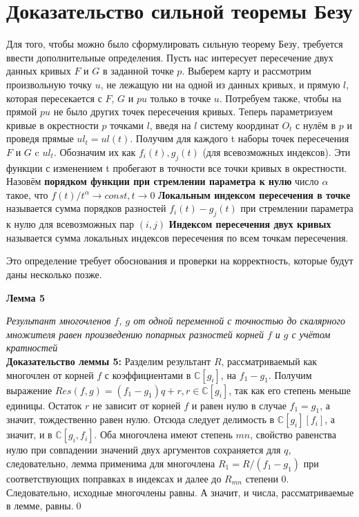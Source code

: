 \documentclass[a4paper, 12pt]{article}
\begin{document}
\pagebreak
\section{Доказательство сильной теоремы Безу}
Для того, чтобы можно было сформулировать сильную теорему Безу, требуется ввести дополнительные определения.\newline
Пусть нас интересует пересечение двух данных кривых $F$ и $G$ в заданной точке $p$. Выберем карту и рассмотрим произвольную точку $u$, не лежащую ни на одной из данных кривых, и прямую $l$, которая пересекается с $F$, $G$ и $pu$ только в точке $u$. Потребуем также, чтобы на прямой $pu$ не было других точек пересечения кривых. Теперь параметризуем кривые в окрестности $p$ точками $l$, введя на $l$ систему координат $O_t$ с нулём в $p$ и проведя прямые $ul_t=ul(t)$. Получим для каждого t наборы точек пересечения $F$ и $G$ c $ul_t$. Обозначим их как $f_i(t), g_j(t)$ (для всевозможных индексов). Эти функции с изменением t пробегают в точности все точки кривых в окрестности. \newline %
Назовём \textbf{порядком функции при стремлении параметра к нулю} число $\alpha$ такое, что $f(t)/t^\alpha \rightarrow const, t \rightarrow 0$\newline
\textbf{Локальным индексом пересечения в точке} называется сумма порядков разностей $f_i(t) - g_j(t)$ при стремлении параметра к нулю для всевозможных пар $(i,j)$\newline
\textbf{Индексом пересечения двух кривых} называется сумма локальных индексов пересечения по всем точкам пересечения.
\newline

Это определение требует обоснования и проверки на корректность, которые будут даны несколько позже.
\newline

\textbf{Лемма 5}

\textit{Результант многочленов $f$, $g$ от одной переменной с точностью до скалярного множителя равен произведению попарных разностей корней $f$ и $g$ с учётом кратностей}\\

\textbf{Доказательство леммы 5:}\newline
Разделим результант $R$, рассматриваемый как многочлен от корней $f$ с коэффициентами в $\mathbb{C}[g_i]$, на $f_1 - g_1$. Получим выражение $Res(f,g) = (f_1 - g_1)q + r, r \in \mathbb{C}[g_i]$, так как его степень меньше единицы.
Остаток $r$ не зависит от корней $f$ и равен нулю в случае $f_1 = g_1$, а значит, тождественно равен нулю.\newline
Отсюда следует делимость в $\mathbb{C}[g_i][f_i]$, а значит, и в $\mathbb{C}[g_i, f_i]$. Оба многочлена имеют степень $mn$, свойство равенства нулю при совпадении значений двух аргументов сохраняется для $q$, следовательно, лемма применима для многочлена $R_1 = R/(f_1-g_1)$ при соответствующих поправках в индексах и далее до $R_{mn}$ степени 0. Следовательно, исходные многочлены равны. А значит, и числа, рассматриваемые в лемме, равны.\qed\\
\end{document}
